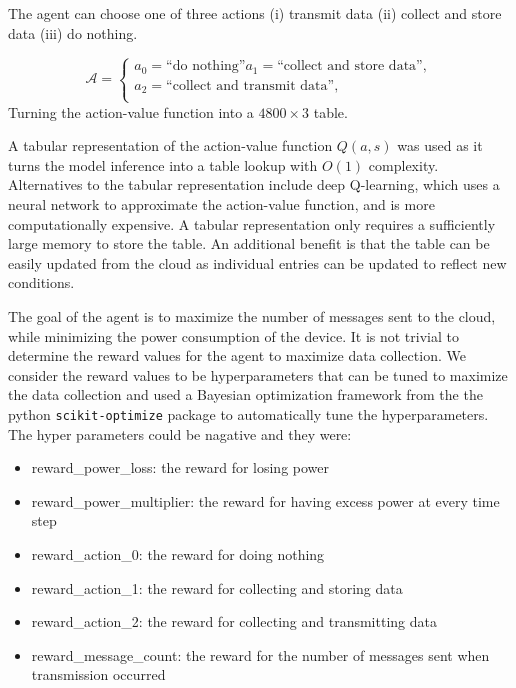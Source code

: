 \documentclass[10pt]{cai}
\begin{document}
The agent can choose one of three actions (i) transmit data (ii) collect and store data (iii) do nothing.

\begin{equation}
  \mathcal{A} = \left\{
  \begin{array}{l}
    a_0 = \text{``do nothing''}
    a_1 = \text{``collect and store data''}, \\
    a_2 = \text{``collect and transmit data''}, \\
  \end{array}
  \right.
  \end{equation}
Turning the action-value function into a $4800 \times 3$ table.
  
A tabular representation of the action-value function $Q(a,s)$ was used as it turns the model inference into a table lookup with $O(1)$ complexity.
Alternatives to the tabular representation include deep Q-learning, which uses a neural network to approximate the action-value function, and is more computationally expensive.
A tabular representation only requires a sufficiently large memory to store the table.
An additional benefit is that the table can be easily updated from the cloud as individual entries can be updated to reflect new conditions.

The goal of the agent is to maximize the number of messages sent to the cloud, while minimizing the power consumption of the device.
It is not trivial to determine the reward values for the agent to maximize data collection.
We consider the reward values to be hyperparameters that can be tuned to maximize the data collection and used a Bayesian optimization framework from the the python \verb|scikit-optimize| package to automatically tune the hyperparameters.
The hyper parameters could be nagative and they were:
\begin{itemize}
  \item reward\_power\_loss: the reward for losing power
  \item reward\_power\_multiplier: the reward for having excess power at every time step
  \item reward\_action\_0: the reward for doing nothing
  \item reward\_action\_1: the reward for collecting and storing data
  \item reward\_action\_2: the reward for collecting and transmitting data
  \item reward\_message\_count: the reward for the number of messages sent when transmission occurred
\end{itemize}
\end{document}
